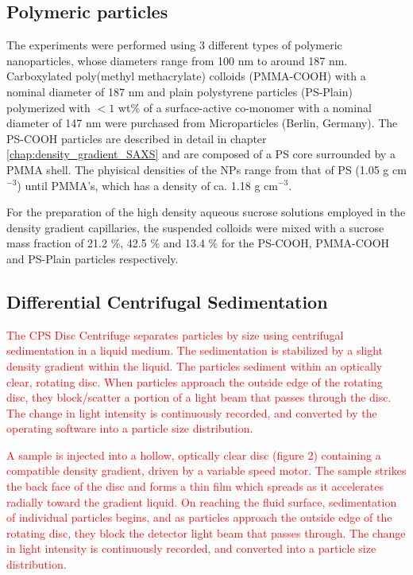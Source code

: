 \subsection{Polymeric particles}

The experiments were performed using 3 different types of polymeric nanoparticles, whose diameters range from 100 nm to around 187 nm. Carboxylated poly(methyl methacrylate) colloids (PMMA-COOH) with a nominal diameter of 187 nm and plain polystyrene particles (PS-Plain) polymerized with $<1$ wt$\%$ of a surface-active co-monomer with a nominal diameter of 147 nm were purchased from Microparticles (Berlin, Germany). The PS-COOH particles are described in detail in chapter \ref{chap:density_gradient_SAXS} and are composed of a PS core surrounded by a PMMA shell. The phyisical densities of the NPs range from that of PS (1.05 g cm$^{-3}$) until PMMA's, which has a density of ca. 1.18 g cm$^{-3}$.

For the preparation of the high density aqueous sucrose solutions employed in the density gradient capillaries, the suspended colloids were mixed with a sucrose mass fraction of 21.2 $\%$, 42.5 $\%$ and 13.4 $\%$ for the PS-COOH, PMMA-COOH and PS-Plain particles respectively.


\subsection{Differential Centrifugal Sedimentation}
\label{sec:DCS_experimental}

\textcolor{red}{The CPS Disc Centrifuge separates particles by size using centrifugal sedimentation in a liquid medium. The sedimentation is stabilized by a slight density gradient within the liquid. The particles sediment within an optically clear, rotating disc. When particles approach the outside edge of the rotating disc, they block/scatter a portion of a light beam that passes through the disc. The change in light intensity is continuously recorded, and converted by the operating software into a particle size distribution.}

\textcolor{red}{A sample is injected into a hollow, optically clear disc (figure 2) containing a compatible density gradient, driven by a variable speed motor. The sample strikes the back face of the disc and forms a thin film which spreads as it accelerates radially toward the gradient liquid. On reaching the fluid surface, sedimentation of individual particles begins, and as particles approach the outside edge of the rotating disc, they block the detector light beam that passes through. The change in light intensity is continuously recorded, and converted into a particle size distribution.}

